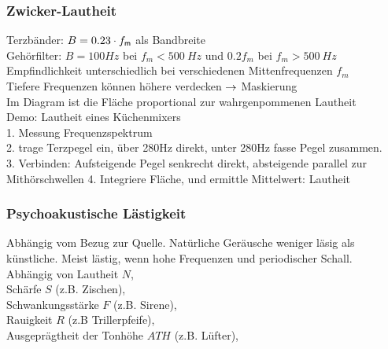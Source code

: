 \documentclass[fs, footer]{latex4ei}
\begin{document}
\begin{multicols}{4}
{		\subsubsection{Zwicker-Lautheit}
	Terzbänder: $B = 0.23 \cdot f_{\sf m}$ als Bandbreite\\
	Gehörfilter: $B = 100Hz$ bei $f_m < \SI{500}{Hz}$ und $0.2 f_m$ bei $f_m > \SI{500}{Hz}$\\
	Empfindlichkeit unterschiedlich bei verschiedenen Mittenfrequenzen $f_m$\\
	Tiefere Frequenzen können höhere verdecken $\rightarrow$ Maskierung\\

	Im Diagram ist die Fläche proportional zur wahrgenpommenen Lautheit\\
	Demo: Lautheit eines Küchenmixers\\
	1. Messung Frequenzspektrum\\
	2. trage Terzpegel ein, über 280Hz direkt, unter 280Hz fasse Pegel zusammen.\\
	3. Verbinden: Aufsteigende Pegel senkrecht direkt, absteigende parallel zur Mithörschwellen
	4. Integriere Fläche, und ermittle Mittelwert: Lautheit

	\subsubsection{Psychoakustische Lästigkeit}
	Abhängig vom Bezug zur Quelle. Natürliche Geräusche weniger läsig als künstliche.
	Meist lästig, wenn hohe Frequenzen und periodischer Schall.\\
	Abhängig von Lautheit $N$,\\ 
	Schärfe $S$ (z.B. Zischen),\\
	Schwankungsstärke $F$ (z.B. Sirene),\\
	Rauigkeit $R$ (z.B Trillerpfeife),\\
	Ausgeprägtheit der Tonhöhe $ATH$ (z.B. Lüfter),\\ 			%


	
	

}




\end{multicols}
\end{document}
